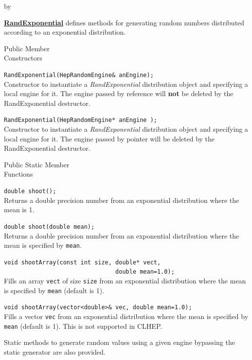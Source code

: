 \documentclass[twoside]{article}
\newcommand{\comp}[1]{\texttt{#1}}%
\newcommand{\entrylabel}[1]{\mbox{\textbf{{#1}}}\hfil}%
\newenvironment{entry}
{\begin{list}{}%
    {\renewcommand{\makelabel}{\entrylabel}%
     \setlength{\labelwidth}{90pt}%
     \setlength{\leftmargin}{\labelwidth}
     \advance\leftmargin by \labelsep%
      }%
    }%
  {\end{list}}
\newcommand{\Entrylabel}[1]%
{\raisebox{0pt}[1ex][0pt]{\makebox[\labelwidth][l]%
    {\parbox[t]{\labelwidth}{\hspace{0pt}\textbf{{#1}}}}}}
\newenvironment{Entry}%
{\renewcommand{\entrylabel}{\Entrylabel}\begin{entry}}%
  {\end{entry}}
\begin{document}
\begin{description}
\begin{Entry}
  \begin{description}
      \item \underline{\bf RandExponential}  defines methods for generating
        random numbers distributed according to an exponential distribution.
  \end{description}
      
\item[Public Member\\ Constructors]

   \verb+RandExponential(HepRandomEngine& anEngine);+\\
   Constructor to instantiate a {\em RandExponential}
   distribution object and specifying a local engine for it.
   The engine passed by reference will {\bf not} be deleted by
   the RandExponential destructor.
   
   \verb+RandExponential(HepRandomEngine* anEngine );+\\
   Constructor to instantiate a {\em RandExponential}
   distribution object and specifying a local engine for it.
   The engine passed by pointer will be deleted by the RandExponential
   destructor.

\item[Public Static Member\\ Functions]

   \verb+double shoot();+\\
   Returns a double precision number from an exponential distribution where the
   mean is 1.
  
   \verb+double shoot(double mean);+\\
   Returns a double precision number from an exponential distribution where the
   mean is specified by \comp{mean}.
  
   \verb+void shootArray(const int size, double* vect,+\\
   \verb+                                double mean=1.0);+\\
   Fills an array \comp{vect} of size \comp{size} from an exponential distribution
   where the mean is specified by \comp{mean} (default is 1).

   \verb+void shootArray(vector<double>& vec, double mean=1.0);+\\
   Fills a vector \comp{vec} from an exponential distribution
   where the mean is specified by \comp{mean} (default is 1).  This
   is not supported in CLHEP.
 
   Static methods to generate random values using a given engine
   bypassing the static generator are also provided.


\end{Entry}
\end{description}
\end{document}
